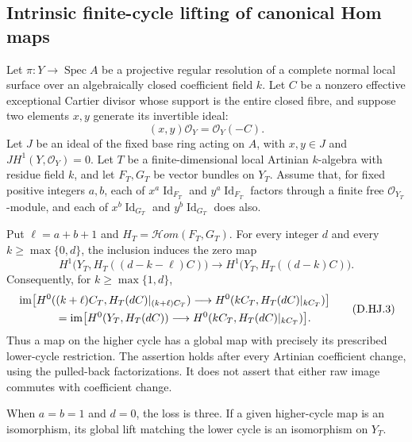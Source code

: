 \subsection{Intrinsic finite-cycle lifting of canonical Hom maps}

\begin{proposition}
\label{D:intrinsic-Hom-fixed-loss-jets}
Let $\pi:Y\to\operatorname{Spec}A$ be a projective regular
resolution of a complete normal local surface over an
algebraically closed coefficient field $k$. Let $C$ be a
nonzero effective exceptional Cartier divisor whose support is
the entire closed fibre, and suppose
two elements $x,y$ generate its invertible ideal:
\[
                 (x,y)\mathcal O_Y=\mathcal O_Y(-C).
                                                        \tag{D.HJ.1}
\]
Let $J$ be an ideal of the fixed base ring acting on $A$, with
$x,y\in J$ and $JH^1(Y,\mathcal O_Y)=0$.
Let $T$ be a finite-dimensional local Artinian $k$-algebra with
residue field $k$, and let $F_T,G_T$ be vector bundles on $Y_T$.
Assume that, for fixed positive integers $a,b$, each of
$x^a\operatorname{Id}_{F_T}$ and $y^a\operatorname{Id}_{F_T}$
factors through a finite free $\mathcal O_{Y_T}$-module,
and each of $x^b\operatorname{Id}_{G_T}$ and
$y^b\operatorname{Id}_{G_T}$ does also.

Put $\ell=a+b+1$ and
$H_T=\mathcal Hom(F_T,G_T)$. For every integer $d$ and every
$k\ge\max\{0,d\}$, the inclusion induces the zero map
\[
 H^1\bigl(Y_T,H_T((d-k-\ell)C)\bigr)
       \longrightarrow H^1\bigl(Y_T,H_T((d-k)C)\bigr).
                                                        \tag{D.HJ.2}
\]
Consequently, for $k\ge\max\{1,d\}$,
\[
 \begin{split}
 &\operatorname{im}\bigl[
 H^0((k+\ell)C_T,H_T(dC)|_{(k+\ell)C_T})
       \longrightarrow H^0(kC_T,H_T(dC)|_{kC_T})\bigr]\\
 &\hspace{12mm}=
 \operatorname{im}\bigl[
 H^0(Y_T,H_T(dC))
       \longrightarrow H^0(kC_T,H_T(dC)|_{kC_T})\bigr].
 \end{split}                                           \tag{D.HJ.3}
\]
Thus a map on the higher cycle has a global map with precisely
its prescribed lower-cycle restriction. The assertion holds
after every Artinian coefficient change, using the pulled-back
factorizations. It does not assert that either raw image
commutes with coefficient change.

When $a=b=1$ and $d=0$, the loss is three. If a given higher-cycle
map is an isomorphism, its global lift matching the lower cycle
is an isomorphism on $Y_T$.
\end{proposition}

